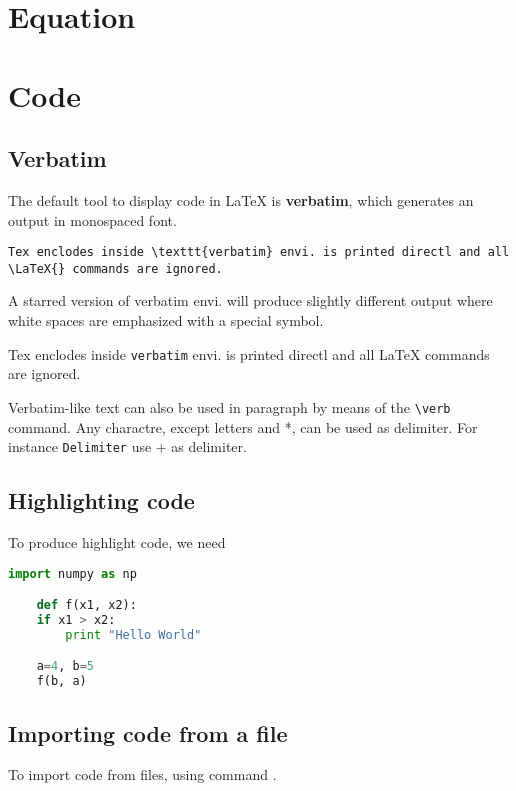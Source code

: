 \section{Equation}

\section{Code}

\subsection{Verbatim}
The default tool to display code in \LaTeX{} is \textbf{verbatim}, which
generates an output in monospaced font. 
\begin{verbatim}
Tex enclodes inside \texttt{verbatim} envi. is printed directl and all
\LaTeX{} commands are ignored.
\end{verbatim}

A starred version of verbatim envi. will produce slightly different output
where white spaces are emphasized with a special symbol.
\begin{verbatim*}
Tex enclodes inside \texttt{verbatim} envi. is printed directl and all
\LaTeX{} commands are ignored.
\end{verbatim*}

Verbatim-like text can also be used in paragraph by means of the
\verb|\verb| command. Any charactre, except letters and *, can be used as
delimiter. For instance \verb+Delimiter+ use + as delimiter.

\subsection{Highlighting code}
To produce highlight code, we need 
\begin{lstlisting}[language=Python]
    import numpy as np

    def f(x1, x2):
	if x1 > x2:
	    print "Hello World"

    a=4, b=5
    f(b, a)
\end{lstlisting}

\subsection{Importing code from a file}
To import code from files, using command \verb||.
\begin{lstlisting}[language=TeX]



\end{lstlisting}

